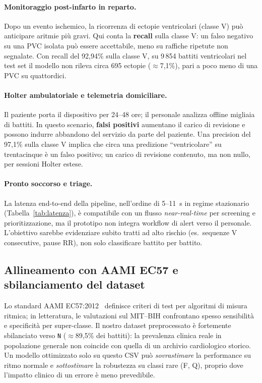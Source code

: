 \paragraph{Monitoraggio post-infarto in reparto.}
Dopo un evento ischemico, la ricorrenza di ectopie ventricolari (classe V) può anticipare aritmie più gravi.
Qui conta la \textbf{recall} sulla classe V: un falso negativo su una PVC isolata può essere accettabile, meno su raffiche ripetute non segnalate.
Con recall del 92,94\% sulla classe V, su 9\,854 battiti ventricolari nel test set il modello non rileva circa 695 ectopie ($\approx$7,1\%), pari a poco meno di una PVC su quattordici.

\paragraph{Holter ambulatoriale e telemetria domiciliare.}
Il paziente porta il dispositivo per 24--48 ore; il personale analizza offline migliaia di battiti.
In questo scenario, \textbf{falsi positivi} aumentano il carico di revisione e possono indurre abbandono del servizio da parte del paziente.
Una precision del 97,1\% sulla classe V implica che circa una predizione ``ventricolare'' su trentacinque è un falso positivo; un carico di revisione contenuto, ma non nullo, per sessioni Holter estese.

\paragraph{Pronto soccorso e triage.}
La latenza end-to-end della pipeline, nell'ordine di 5--11~s in regime stazionario (Tabella~\ref{tab:latenza}), è compatibile con un flusso \emph{near-real-time} per screening e prioritizzazione, ma il prototipo non integra workflow di alert verso il personale.
L'obiettivo sarebbe evidenziare subito tratti ad alto rischio (es.\ sequenze V consecutive, pause RR), non solo classificare battito per battito.

\subsection{Allineamento con AAMI EC57 e sbilanciamento del dataset}

Lo standard AAMI EC57:2012~\cite{aami2012ec57} definisce criteri di test per algoritmi di misura ritmica; in letteratura, le valutazioni sul MIT--BIH confrontano spesso sensibilità e specificità per super-classe.
Il nostro dataset preprocessato è fortemente sbilanciato verso \texttt{N} ($\approx$89,5\% dei battiti): la prevalenza clinica reale in popolazione generale non coincide con quella di un archivio cardiologico storico.
Un modello ottimizzato solo su questo CSV può \emph{sovrastimare} la performance su ritmo normale e \emph{sottostimare} la robustezza su classi rare (F, Q), proprio dove l'impatto clinico di un errore è meno prevedibile.

